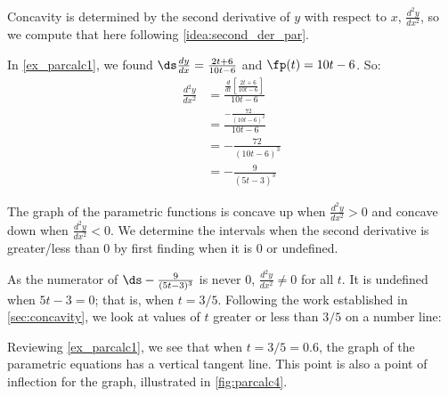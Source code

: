 {Concavity is determined by the second derivative of $y$ with respect to $x$, $\frac{d^2y}{dx^2}$, so we compute that here following \autoref{idea:second_der_par}.

In \autoref{ex_parcalc1}, we found $\ds\frac{dy}{dx} = \frac{2t+6}{10t-6}$ and $\fp(t) = 10t-6$. So:
\begin{align*}
	\frac{d^2y}{dx^2}
	&= \frac{\frac{d}{dt}\left[\frac{2t+6}{10t-6}\right]}{10t-6} \\
	&= \frac{-\frac{72}{(10t-6)^2}}{10t-6}\\
	&= -\frac{72}{(10t-6)^3} \\&= -\frac{9}{(5t-3)^3}
\end{align*}

The graph of the parametric functions is concave up when $\frac{d^2y}{dx^2} > 0$ and concave down when $\frac{d^2y}{dx^2} <0$. We determine the intervals when the second derivative is greater/less than 0 by first finding when it is 0 or undefined.

As the numerator of $\ds -\frac{9}{(5t-3)^3}$ is never 0, $\frac{d^2y}{dx^2} \neq 0$ for all $t$. It is undefined when $5t-3=0$; that is, when $t= 3/5$. Following the work established in \autoref{sec:concavity}, we look at values of $t$ greater or less than $3/5$ on a number line:
\begin{center}
\end{center}

Reviewing \autoref{ex_parcalc1}, we see that when $t=3/5=0.6$, the graph of the parametric equations has a vertical tangent line. This point is also a point of inflection for the graph, illustrated in \autoref{fig:parcalc4}.}

